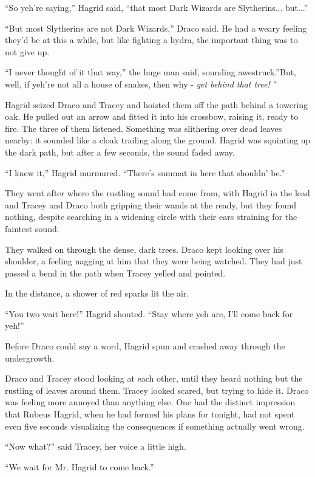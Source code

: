 ``So yeh're saying,'' Hagrid said, ``that most Dark Wizards are
Slytherins... but...''

``But most Slytherins are not Dark Wizards,'' Draco said. He had a weary
feeling they'd be at this a while, but like fighting a hydra, the
important thing was to not give up.

``I never thought of it that way,'' the huge man said, sounding
awestruck.''But, well, if yeh're not all a house of snakes, then why -
\emph{get behind that tree!} ''

Hagrid seized Draco and Tracey and hoisted them off the path behind a
towering oak. He pulled out an arrow and fitted it into his crossbow,
raising it, ready to fire. The three of them listened. Something was
slithering over dead leaves nearby: it sounded like a cloak trailing
along the ground. Hagrid was squinting up the dark path, but after a few
seconds, the sound faded away.

``I knew it,'' Hagrid murmured. ``There's summat in here that shouldn'
be.''

They went after where the rustling sound had come from, with Hagrid in
the lead and Tracey and Draco both gripping their wands at the ready,
but they found nothing, despite searching in a widening circle with
their ears straining for the faintest sound.

They walked on through the dense, dark trees. Draco kept looking over
his shoulder, a feeling nagging at him that they were being watched.
They had just passed a bend in the path when Tracey yelled and pointed.

In the distance, a shower of red sparks lit the air.

``You two wait here!'' Hagrid shouted. ``Stay where yeh are, I'll come
back for yeh!''

Before Draco could say a word, Hagrid spun and crashed away through the
undergrowth.

Draco and Tracey stood looking at each other, until they heard nothing
but the rustling of leaves around them. Tracey looked scared, but trying
to hide it. Draco was feeling more annoyed than anything else. One had
the distinct impression that Rubeus Hagrid, when he had formed his plans
for tonight, had not spent even five seconds visualizing the
consequences if something actually went wrong.

``Now what?'' said Tracey, her voice a little high.

``We wait for Mr. Hagrid to come back.''

